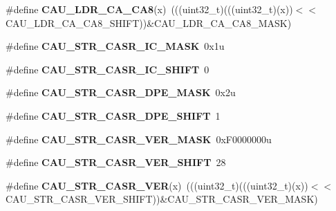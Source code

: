 \begin{DoxyCompactItemize}
\item 
\#define {\bfseries C\+A\+U\+\_\+\+L\+D\+R\+\_\+\+C\+A\+\_\+\+C\+A8}(x)~(((uint32\+\_\+t)(((uint32\+\_\+t)(x))$<$$<$C\+A\+U\+\_\+\+L\+D\+R\+\_\+\+C\+A\+\_\+\+C\+A8\+\_\+\+S\+H\+I\+FT))\&C\+A\+U\+\_\+\+L\+D\+R\+\_\+\+C\+A\+\_\+\+C\+A8\+\_\+\+M\+A\+SK)\hypertarget{group__CAU__Register__Masks_ga2c7bb58b9c62ed37bc454b44f87e015c}{}\label{group__CAU__Register__Masks_ga2c7bb58b9c62ed37bc454b44f87e015c}

\item 
\#define {\bfseries C\+A\+U\+\_\+\+S\+T\+R\+\_\+\+C\+A\+S\+R\+\_\+\+I\+C\+\_\+\+M\+A\+SK}~0x1u\hypertarget{group__CAU__Register__Masks_ga8dffcd6d4b1c0445b861214d9fcb2bbd}{}\label{group__CAU__Register__Masks_ga8dffcd6d4b1c0445b861214d9fcb2bbd}

\item 
\#define {\bfseries C\+A\+U\+\_\+\+S\+T\+R\+\_\+\+C\+A\+S\+R\+\_\+\+I\+C\+\_\+\+S\+H\+I\+FT}~0\hypertarget{group__CAU__Register__Masks_ga6c5490b9ee06c378d9e52f5dcc4e4da6}{}\label{group__CAU__Register__Masks_ga6c5490b9ee06c378d9e52f5dcc4e4da6}

\item 
\#define {\bfseries C\+A\+U\+\_\+\+S\+T\+R\+\_\+\+C\+A\+S\+R\+\_\+\+D\+P\+E\+\_\+\+M\+A\+SK}~0x2u\hypertarget{group__CAU__Register__Masks_ga44bc22302cf006a4b12f130de2f509ab}{}\label{group__CAU__Register__Masks_ga44bc22302cf006a4b12f130de2f509ab}

\item 
\#define {\bfseries C\+A\+U\+\_\+\+S\+T\+R\+\_\+\+C\+A\+S\+R\+\_\+\+D\+P\+E\+\_\+\+S\+H\+I\+FT}~1\hypertarget{group__CAU__Register__Masks_gade64f9ddd7c12103c652b284f192d6ea}{}\label{group__CAU__Register__Masks_gade64f9ddd7c12103c652b284f192d6ea}

\item 
\#define {\bfseries C\+A\+U\+\_\+\+S\+T\+R\+\_\+\+C\+A\+S\+R\+\_\+\+V\+E\+R\+\_\+\+M\+A\+SK}~0x\+F0000000u\hypertarget{group__CAU__Register__Masks_ga5447564cf9ebe8e0ed52d5367304d0cd}{}\label{group__CAU__Register__Masks_ga5447564cf9ebe8e0ed52d5367304d0cd}

\item 
\#define {\bfseries C\+A\+U\+\_\+\+S\+T\+R\+\_\+\+C\+A\+S\+R\+\_\+\+V\+E\+R\+\_\+\+S\+H\+I\+FT}~28\hypertarget{group__CAU__Register__Masks_ga8103f4482a52d4ea2c47a26161596b66}{}\label{group__CAU__Register__Masks_ga8103f4482a52d4ea2c47a26161596b66}

\item 
\#define {\bfseries C\+A\+U\+\_\+\+S\+T\+R\+\_\+\+C\+A\+S\+R\+\_\+\+V\+ER}(x)~(((uint32\+\_\+t)(((uint32\+\_\+t)(x))$<$$<$C\+A\+U\+\_\+\+S\+T\+R\+\_\+\+C\+A\+S\+R\+\_\+\+V\+E\+R\+\_\+\+S\+H\+I\+FT))\&C\+A\+U\+\_\+\+S\+T\+R\+\_\+\+C\+A\+S\+R\+\_\+\+V\+E\+R\+\_\+\+M\+A\+SK)\hypertarget{group__CAU__Register__Masks_ga1b0d6cb73fdaaf5a5d9adc1c95d296c6}{}\label{group__CAU__Register__Masks_ga1b0d6cb73fdaaf5a5d9adc1c95d296c6}


\end{DoxyCompactItemize}
